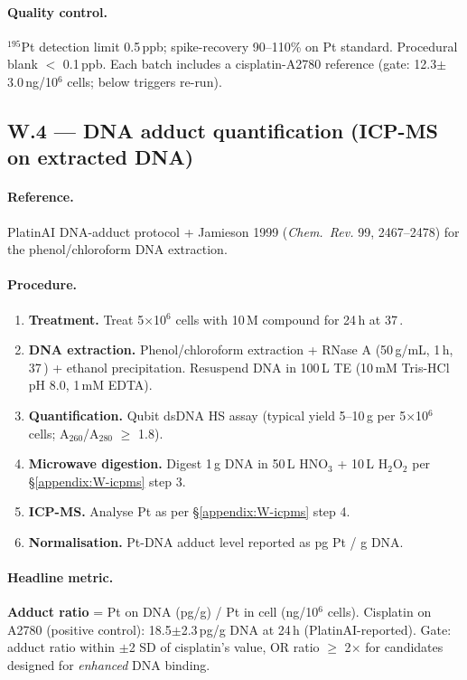 \paragraph{Quality control.}
$^{195}$Pt detection limit 0.5\,ppb; spike-recovery
90--110\% on Pt standard.  Procedural blank $<$ 0.1\,ppb.
Each batch includes a cisplatin-A2780 reference (gate:
12.3$\pm$3.0\,ng/10$^6$ cells; below triggers re-run).

\subsection{W.4 --- DNA adduct quantification (ICP-MS on extracted DNA)}
\label{appendix:W-dna}

\paragraph{Reference.}
PlatinAI DNA-adduct protocol
\citep{rusanov2025platinai} + Jamieson 1999
(\emph{Chem.~Rev.} 99, 2467--2478) for the
phenol/chloroform DNA extraction.

\paragraph{Procedure.}
\begin{enumerate}
  \item \textbf{Treatment.}  Treat 5$\times$10$^6$ cells
        with 10\,\textmu M compound for 24\,h at
        37\,\textcelsius.
  \item \textbf{DNA extraction.}  Phenol/chloroform
        extraction + RNase A (50\,\textmu g/mL, 1\,h,
        37\,\textcelsius) + ethanol precipitation.
        Resuspend DNA in 100\,\textmu L TE (10\,mM
        Tris-HCl pH 8.0, 1\,mM EDTA).
  \item \textbf{Quantification.}  Qubit dsDNA HS assay
        (typical yield 5--10\,\textmu g per 5$\times$10$^6$
        cells; A$_{260}$/A$_{280}$ $\geq$ 1.8).
  \item \textbf{Microwave digestion.}  Digest 1\,\textmu g
        DNA in 50\,\textmu L HNO$_3$ + 10\,\textmu L
        H$_2$O$_2$ per \S\ref{appendix:W-icpms} step 3.
  \item \textbf{ICP-MS.}  Analyse Pt as per
        \S\ref{appendix:W-icpms} step 4.
  \item \textbf{Normalisation.}  Pt-DNA adduct level
        reported as pg Pt / \textmu g DNA.
\end{enumerate}

\paragraph{Headline metric.}
\textbf{Adduct ratio} = Pt on DNA (pg/\textmu g) / Pt in
cell (ng/10$^6$ cells).  Cisplatin on A2780 (positive
control): 18.5$\pm$2.3\,pg/\textmu g DNA at 24\,h
(PlatinAI-reported).  Gate: adduct ratio within $\pm$2 SD
of cisplatin's value, OR ratio $\geq$ 2$\times$ for
candidates designed for \emph{enhanced} DNA binding.

